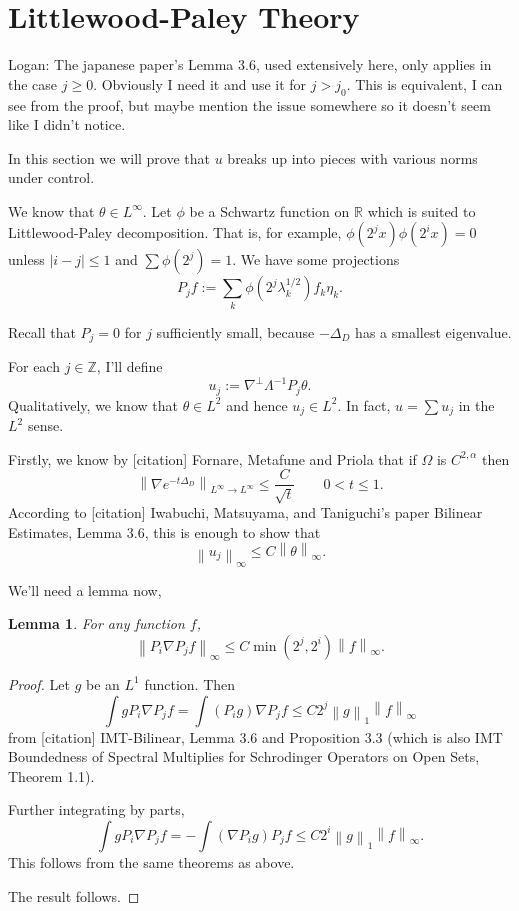 \documentclass[11pt]{amsart}
\newtheorem{lemma}[theorem]{Lemma}
\theoremstyle{remark}
\theoremstyle{definition}
\newcommand{\R}{\mathbb{R}}
\newcommand{\Z}{\mathbb{Z}}
\newcommand{\norm}[1]{\left\lVert#1\right\rVert}
\newcommand{\grad}{\nabla}
\newcommand{\Laplace}{\Delta}
\newcommand{\eigen}[1]{\eta_{#1}} %
\begin{document}

\section{Littlewood-Paley Theory} \label{sec:littlewood paley}

Logan: The japanese paper's Lemma 3.6, used extensively here, only applies in the case $j \geq 0$. Obviously I need it and use it for $j > j_0$.  This is equivalent, I can see from the proof, but maybe mention the issue somewhere so it doesn't seem like I didn't notice.  

In this section we will prove that $u$ breaks up into pieces with various norms under control.  

We know that $\theta \in L^\infty$.  Let $\phi$ be a Schwartz function on $\R$ which is suited to Littlewood-Paley decomposition.  That is, for example, $\phi(2^j x) \phi(2^i x) = 0$ unless $|i-j|\leq 1$ and $\sum \phi(2^j) = 1$.  We have some projections 
\[ P_j f := \sum_k \phi(2^j \lambda_k^{1/2}) f_k \eigen{k}. \]

Recall that $P_j = 0$ for $j$ sufficiently small, because $-\Laplace_D$ has a smallest eigenvalue.  

For each $j \in \Z$, I'll define
\[ u_j := \grad^\perp \Lambda^{-1} P_j \theta. \]
Qualitatively, we know that $\theta \in L^2$ and hence $u_j \in L^2$.  In fact, $u = \sum u_j$ in the $L^2$ sense.  

Firstly, we know by [citation] Fornare, Metafune and Priola that if $\Omega$ is $C^{2,\alpha}$ then
\[ \norm{\grad e^{-t\Laplace_D}}_{L^\infty \to L^\infty} \leq \frac{C}{\sqrt{t}} \qquad 0 < t \leq 1. \]
According to [citation] Iwabuchi, Matsuyama, and Taniguchi's paper Bilinear Estimates, Lemma 3.6, this is enough to show that
\[ \norm{u_j}_\infty \leq C \norm{\theta}_\infty. \]

We'll need a lemma now,
\begin{lemma} \label{thm:grad and proj}
For any function $f$,
\[ \norm{P_i \grad P_j f}_\infty \leq C \min(2^j,2^i) \norm{f}_\infty. \]
\end{lemma}
\begin{proof}
Let $g$ be an $L^1$ function.  Then
\[ \int g P_i \grad P_j f = \int (P_i g) \grad P_j f \leq C 2^j \norm{g}_1 \norm{f}_\infty \]
from [citation] IMT-Bilinear, Lemma 3.6 and Proposition 3.3 (which is also IMT Boundedness of Spectral Multiplies for Schrodinger Operators on Open Sets, Theorem 1.1).  

Further integrating by parts,
\[ \int g P_i \grad P_j f = - \int (\grad P_i g) P_j f \leq C 2^i \norm{g}_1 \norm{f}_\infty. \]
This follows from the same theorems as above.  

The result follows.  
\end{proof}
\end{document}
